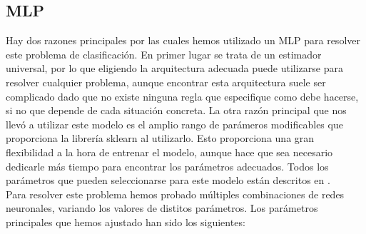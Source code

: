 \documentclass[journal,twoside]{JoPhA}
\begin{document}
\subsection{MLP}
Hay dos razones principales por las cuales hemos utilizado un MLP para resolver este problema de clasificación. En primer lugar se trata de un estimador universal, por lo que eligiendo la arquitectura adecuada puede utilizarse para resolver cualquier problema, aunque encontrar esta arquitectura suele ser complicado dado que no existe ninguna regla que especifique como debe hacerse, si no que depende de cada situación concreta. La otra razón principal que nos llevó a utilizar este modelo es el amplio rango de parámeros modificables que proporciona la librería sklearn al utilizarlo. Esto proporciona una gran flexibilidad a la hora de entrenar el modelo, aunque hace que sea necesario dedicarle más tiempo para encontrar los parámetros adecuados. Todos los parámetros que pueden seleccionarse para este modelo están descritos en \cite{mlp}. \\

Para resolver este problema hemos probado múltiples combinaciones de redes neuronales, variando los valores de distitos parámetros. Los parámetros principales que hemos ajustado han sido los siguientes: \\
\end{document}
